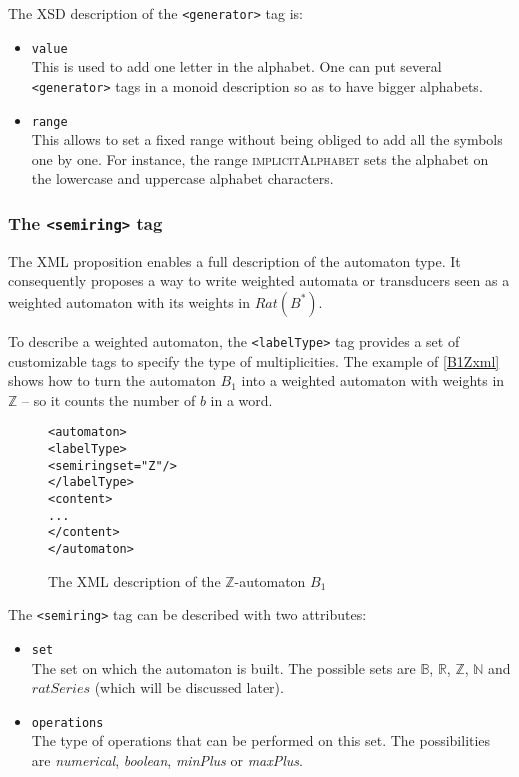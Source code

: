 \documentclass[a4paper]{article}
\newcommand{\xtag}[1]{\texttt{<#1>}}
\newcommand{\xattr}[1]{\texttt{#1}}
\begin{document}
The XSD description of the \xtag{generator} tag is:
\begin{itemize}
\item \xattr{value}\\
  This is used to add one letter in the alphabet. One can put several
  \xtag{generator} tags in a monoid description so as to have bigger
  alphabets.
\item \xattr{range}\\
  This allows to set a fixed range without being obliged to add all
  the symbols one by one. For instance, the range \textsc{implicitAlphabet}
  sets the alphabet on the lowercase and uppercase alphabet characters.
\end{itemize}

\subsubsection{The \xtag{semiring} tag}

The XML proposition enables a full description of the automaton type.
It consequently proposes a way to write weighted automata or
transducers seen as a weighted automaton with its weights in
$Rat(B^*)$.

To describe a weighted automaton, the \xtag{labelType} tag provides a set of
customizable tags to specify the type of multiplicities. The example
of \autoref{B1Zxml} shows how to turn the automaton $B_1$ into a
weighted automaton with weights in ${\mathbb Z}$ -- so it counts the
number of $b$ in a word.

\begin{figure}[ht]
  \small
  \begin{center}
\begin{alltt}
<automaton>
  \xtag{labelType}
     <semiring set="Z"/>
  </labelType>
  <content>
  ...
  </content>
</automaton>
\end{alltt}

\caption{The XML description of the $\mathbb{Z}$-automaton $B_1$}
\label{B1Zxml}
  \end{center}
\end{figure}

The \xtag{semiring} tag can be described with two attributes:
\begin{itemize}
\item \xattr{set}\\
  The set on which the automaton is built. The possible sets are
  ${\mathbb B}$, ${\mathbb R}$, ${\mathbb Z}$, ${\mathbb N}$ and
  $ratSeries$ (which will be discussed later).
\item \xattr{operations}\\
  The type of operations that can be performed on this set.  The
  possibilities are \textit{numerical}, \textit{boolean},
  \textit{minPlus} or \textit{maxPlus}.
\end{itemize}
\end{document}
